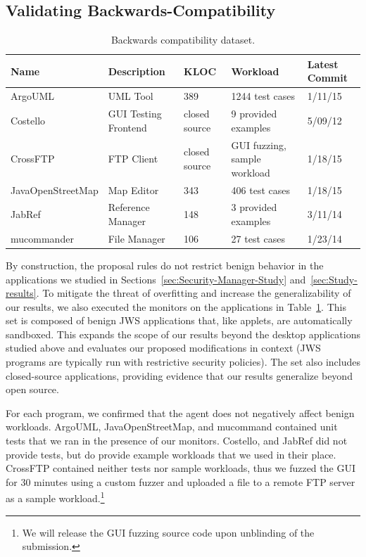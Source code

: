 \documentclass{sig-alternate}
\begin{document}
\subsection{Validating Backwards-Compatibility}\label{sec:backcompat}
\begin{table}
\caption{\label{tab:validation-programs}
Backwards compatibility dataset.}
\centering

\begin{tabular}{lllll}
\toprule 
\textbf{Name} & \textbf{Description} & \textbf{KLOC} & \textbf{Workload} & \textbf{Latest Commit}\tabularnewline
\midrule
ArgoUML & UML Tool & 389 & 1244 test cases & 1/11/15 \tabularnewline
Costello & GUI Testing Frontend & closed source & 9 provided examples & 5/09/12 \tabularnewline
CrossFTP & FTP Client & closed source & GUI fuzzing, sample workload & 1/18/15 \tabularnewline
JavaOpenStreetMap & Map Editor & 343 & 406 test cases & 1/18/15 \tabularnewline
JabRef & Reference Manager & 148 & 3 provided examples & 3/11/14 \tabularnewline 
mucommander & File Manager & 106 & 27 test cases & 1/23/14 \tabularnewline
\bottomrule
\end{tabular}
\vspace{-0.5cm}
\end{table}

By construction, the proposal rules do not restrict
benign behavior in the applications we studied in
Sections~\ref{sec:Security-Manager-Study} and~\ref{sec:Study-results}.
To mitigate the threat of overfitting and increase the generalizability of our results, we 
also executed the monitors on the applications
in Table~\ref{tab:validation-programs}. This set is composed of benign JWS
applications that, like applets, are automatically sandboxed.  This
expands the scope of our results beyond the desktop applications
studied above and evaluates our proposed modifications in 
context (JWS programs are typically run with restrictive
security policies).  The set also includes closed-source applications,
providing evidence that our results generalize beyond open
source.

For each program, we confirmed that the agent does not negatively affect benign workloads. ArgoUML, JavaOpenStreetMap, and mucommand 
contained unit tests that we ran in the presence of our monitors. Costello, and
JabRef did not provide tests, but do provide example workloads that we used
in their place. CrossFTP contained neither tests nor sample workloads, thus
we fuzzed the GUI for 30 minutes using a custom fuzzer and uploaded a file to a
remote FTP server as a sample workload.\footnote{We will release the GUI fuzzing
  source code upon unblinding of the submission.}
\end{document}
